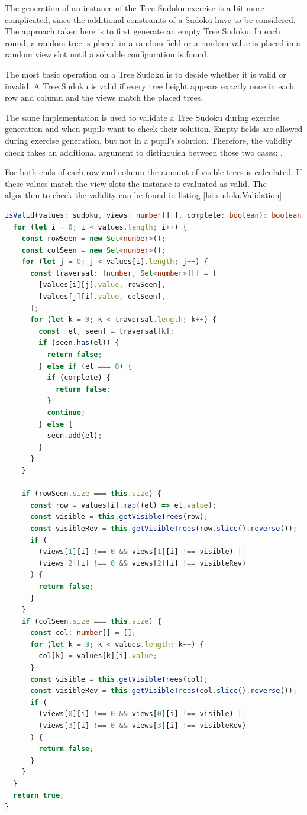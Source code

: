 The generation of an instance of the Tree Sudoku exercise is a bit more complicated, since the additional constraints of a Sudoku have to be considered. The approach taken here is to first generate an empty Tree Sudoku. In each round, a random tree is placed in a random field or a random value is placed in a random view slot until a solvable configuration is found. 

The most basic operation on a Tree Sudoku is to decide whether it is valid or invalid. A Tree Sudoku is valid if every tree height appears exactly once in each row and column and the views match the placed trees.

The same implementation is used to validate a Tree Sudoku during exercise generation and when pupils want to check their solution. Empty fields  are allowed during exercise generation, but not in a pupil's solution. Therefore, the validity check takes an additional argument to distinguish between those two cases: .

For both ends of each row and column the amount of visible trees is calculated. If these values match the view slots the instance is evaluated as valid. The algorithm to check the validity can be found in listing \ref{lst:sudokuValidation}.

\begin{lstlisting}[language=TypeScript,caption={Validation algorithm for a Tree Sudoku instance},label={lst:sudokuValidation}]
isValid(values: sudoku, views: number[][], complete: boolean): boolean {
  for (let i = 0; i < values.length; i++) {
    const rowSeen = new Set<number>();
    const colSeen = new Set<number>();
    for (let j = 0; j < values[i].length; j++) {
      const traversal: [number, Set<number>][] = [
        [values[i][j].value, rowSeen],
        [values[j][i].value, colSeen],
      ];
      for (let k = 0; k < traversal.length; k++) {
        const [el, seen] = traversal[k];
        if (seen.has(el)) {
          return false;
        } else if (el === 0) {
          if (complete) {
            return false;
          }
          continue;
        } else {
          seen.add(el);
        }
      }
    }

    if (rowSeen.size === this.size) {
      const row = values[i].map((el) => el.value);
      const visible = this.getVisibleTrees(row);
      const visibleRev = this.getVisibleTrees(row.slice().reverse());
      if (
        (views[1][i] !== 0 && views[1][i] !== visible) ||
        (views[2][i] !== 0 && views[2][i] !== visibleRev)
      ) {
        return false;
      }
    }
    if (colSeen.size === this.size) {
      const col: number[] = [];
      for (let k = 0; k < values.length; k++) {
        col[k] = values[k][i].value;
      }
      const visible = this.getVisibleTrees(col);
      const visibleRev = this.getVisibleTrees(col.slice().reverse());
      if (
        (views[0][i] !== 0 && views[0][i] !== visible) ||
        (views[3][i] !== 0 && views[3][i] !== visibleRev)
      ) {
        return false;
      }
    }
  }
  return true;
}
\end{lstlisting}

